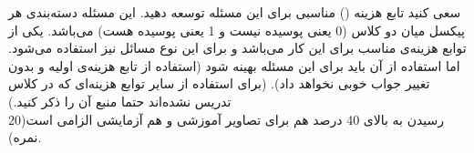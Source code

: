 \documentclass[12pt]{article}
\begin{document}
\begin{enumerate}
    سعی کنید تابع هزینه () مناسبی برای این مسئله توسعه دهید. این مسئله دسته‌بندی هر پیکسل میان دو کلاس (0 یعنی پوسیده نیست و 1 یعنی پوسیده هست) می‌باشد. یکی از توابع هزینه‌ی مناسب برای این کار  می‌باشد و برای این نوع مسائل نیز استفاده می‌شود. اما استفاده از آن باید برای این مسئله بهینه شود (استفاده از تابع هزینه‌ی  اولیه و بدون تغییر جواب خوبی نخواهد داد). (برای استفاده از سایر توابع هزینه‌ای که در کلاس تدریس نشده‌اند حتما منبع آن را ذکر کنید.)\\

    رسیدن به \href{https://oecd.ai/en/catalogue/metrics/dice-score#:~:text=The%20Dice%20score%20ranges%20from,of%20elements%20in%20set%20B)}{\lr{dice score}} بالای 40 درصد هم برای تصاویر آموزشی و هم آزمایشی الزامی است(20 نمره).\\
    

\end{enumerate}
\end{document}
